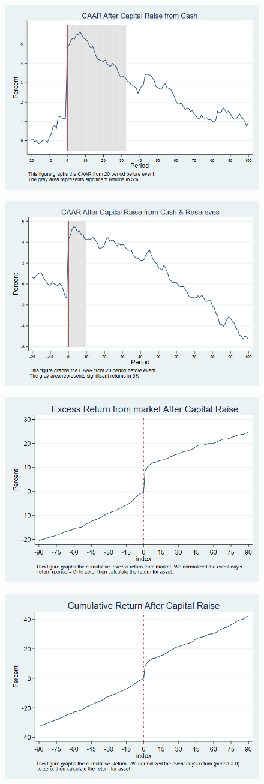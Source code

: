 \documentclass[12pt]{article}
\begin{document}
\begin{figure}
\centering
\includegraphics[width=0.7\linewidth]{AbReturnCash}
\caption{}
\label{fig:abreturncash}
\end{figure}
\begin{figure}
\centering
\includegraphics[width=0.7\linewidth]{AbReturnHybrid}
\caption{}
\label{fig:abreturnhybrid}
\end{figure}




\begin{figure}
\centering
\includegraphics[width=0.7\linewidth]{EReturn}
\caption{}
\label{fig:ereturn}
\end{figure}

\begin{figure}
\centering
\includegraphics[width=0.7\linewidth]{Return}
\caption{}
\label{fig:return}
\end{figure}
\end{document}
